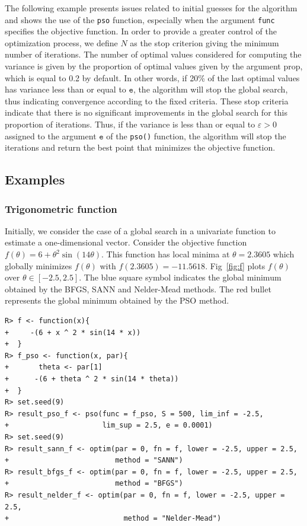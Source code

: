 \documentclass[10pt,letterpaper]{article}
\begin{document}
The following example presents issues related to  initial guesses for the algorithm
and shows the use of the {\tt pso} function, especially when the argument {\tt func} specifies the objective function.
In order to provide a greater control of the optimization process, we define $N$ as the stop criterion giving the minimum number of iterations.
The number of optimal values considered for computing  the variance is given by the proportion of optimal values given by the argument prop,
which is equal to 0.2 by default.
In other words, if 20\% of the last optimal values has variance less than or equal to $\texttt{e}$, the algorithm will stop
the global search, thus indicating convergence according to the fixed criteria.
These stop criteria indicate that there is no significant improvements
in the global search for this proportion of iterations.
Thus, if the variance is less than or equal to $\varepsilon > 0$ assigned to the
argument $\texttt{e}$ of the \texttt{pso()} function, the algorithm will stop the iterations and return the best point that minimizes the objective
function.

\subsection{Examples}

\subsubsection{Trigonometric function}

Initially, we consider the case of a global search in a univariate function to estimate a one-dimensional vector.
Consider the objective function $f(\theta) = 6 + \theta^2 \sin(14\theta)$.
This function has  local minima at $\theta= 2.3605$ which globally minimizes $f(\theta)$ with $f(2.3605) = -11.5618$.
Fig~\ref{fig:f} plots $f(\theta)$ over $\theta \in [-2.5, 2.5]$.
The blue square symbol indicates the global minimum obtained by the
BFGS, SANN and Nelder-Mead methods.
The red bullet represents the global minimum obtained by the PSO method.

\begin{verbatim}
R> f <- function(x){
+     -(6 + x ^ 2 * sin(14 * x))
+  }
R> f_pso <- function(x, par){
+	    theta <- par[1]
+ 	   -(6 + theta ^ 2 * sin(14 * theta))
+  }
R> set.seed(9)
R> result_pso_f <- pso(func = f_pso, S = 500, lim_inf = -2.5,
+                      lim_sup = 2.5, e = 0.0001)
R> set.seed(9)
R> result_sann_f <- optim(par = 0, fn = f, lower = -2.5, upper = 2.5,
+                         method = "SANN")
R> result_bfgs_f <- optim(par = 0, fn = f, lower = -2.5, upper = 2.5,
+                         method = "BFGS")
R> result_nelder_f <- optim(par = 0, fn = f, lower = -2.5, upper = 2.5,
+                           method = "Nelder-Mead")
\end{verbatim}
\end{document}
